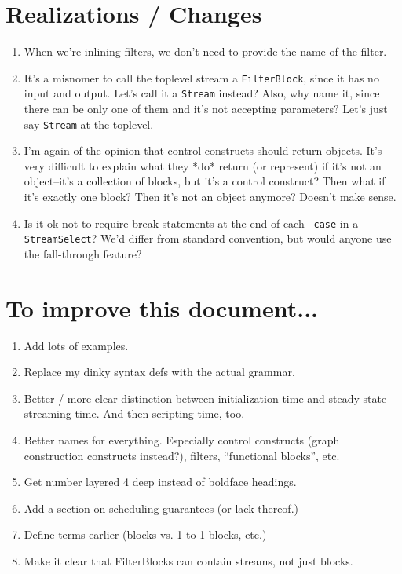 \documentclass[draft]{article}
\begin{document}
\section{Realizations / Changes}

\begin{enumerate}

\item When we're inlining filters, we don't need to provide the name
of the filter.

\item It's a misnomer to call the toplevel stream a {\tt FilterBlock},
since it has no input and output.  Let's call it a {\tt Stream}
instead?  Also, why name it, since there can be only one of them and
it's not accepting parameters?  Let's just say {\tt Stream} at the
toplevel.

\item I'm again of the opinion that control constructs should return
objects.  It's very difficult to explain what they *do* return (or
represent) if it's not an object--it's a collection of blocks, but
it's a control construct?  Then what if it's exactly one block?  Then
it's not an object anymore?  Doesn't make sense.

\item Is it ok not to require break statements at the end of each {\tt
case} in a {\tt StreamSelect}?  We'd differ from standard convention,
but would anyone use the fall-through feature?

\end{enumerate}

\section{To improve this document...}

\begin{enumerate}

\item Add lots of examples.

\item Replace my dinky syntax defs with the actual grammar.

\item Better / more clear distinction between initialization time and
steady state streaming time.  And then scripting time, too.

\item Better names for everything.  Especially control constructs
(graph construction constructs instead?), filters, ``functional
blocks'', etc.

\item Get number layered 4 deep instead of boldface headings.

\item Add a section on scheduling guarantees (or lack thereof.)

\item Define terms earlier (blocks vs. 1-to-1 blocks, etc.)

\item Make it clear that FilterBlocks can contain streams, not just
blocks.

\end{enumerate}
\end{document}
